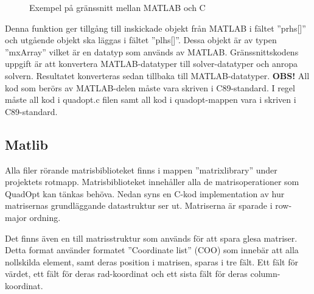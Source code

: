 \begin{figure}[H]

\caption{Exempel på gränssnitt mellan MATLAB och C}
\label{fig:mex2}
\end{figure}  

\noindent Denna funktion ger tillgång till inskickade objekt från MATLAB i fältet ''prhs[]'' och utgående objekt ska läggas i fältet ''plhs[]''. Dessa objekt är av typen ''mxArray'' vilket är en datatyp som används av MATLAB. Gränssnittskodens uppgift är att konvertera MATLAB-datatyper till solver-datatyper och anropa solvern. Resultatet konverteras sedan tillbaka till MATLAB-datatyper.
\newline
\newline
\textbf{OBS!} All kod som berörs av MATLAB-delen måste vara skriven i C89-standard. I regel måste all kod i quadopt.c filen samt all kod i quadopt-mappen vara i skriven i C89-standard. 


\subsection{Matlib}
Alla filer rörande matrisbiblioteket finns i mappen ''matrixlibrary'' under projektets rotmapp.
\newline
\newline
Matrisbiblioteket innehåller alla de matrisoperationer som QuadOpt kan tänkas behöva. Nedan syns en C-kod implementation av hur matrisernas grundläggande datastruktur ser ut. Matriserna är sparade i row-major ordning.



\noindent Det finns även en till matrisstruktur som används för att spara glesa matriser. Detta format använder formatet ''Coordinate list'' (COO) som innebär att alla nollskilda element, samt deras position i matrisen, sparas i tre fält. Ett fält för värdet, ett fält för deras rad-koordinat och ett sista fält för deras column-koordinat.

